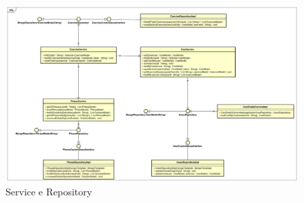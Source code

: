 \begin{figure}[H]
\centering
\includegraphics[width=17cm, keepaspectratio]{img/Service-repository.png} 
\caption{Service e Repository}
\end{figure}
